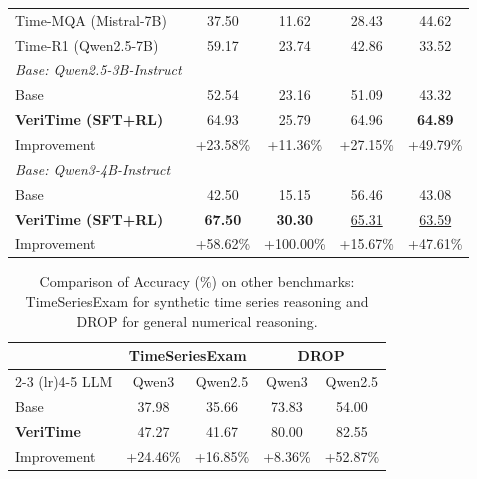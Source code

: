 \documentclass{article}
\theoremstyle{plain}
\theoremstyle{definition}
\theoremstyle{remark}
\begin{document}
\begin{table}[htbp]
\begin{tabular}{lcccc}
Time-MQA (Mistral-7B) & 37.50 & 11.62 & 28.43 & 44.62 \\
Time-R1 (Qwen2.5-7B) & 59.17 & 23.74 & 42.86 & 33.52 \\
\midrule
\textit{Base: Qwen2.5-3B-Instruct} \\
Base & 52.54 & 23.16 & 51.09 & 43.32 \\
\textbf{VeriTime (SFT+RL)} & 64.93 & 25.79 & 64.96 & \textbf{64.89} \\
\rowcolor{cyan!10} Improvement & +23.58\% & +11.36\% & +27.15\% & +49.79\% \\
\midrule
\textit{Base: Qwen3-4B-Instruct} \\
Base & 42.50 & 15.15 & 56.46 & 43.08 \\
\textbf{VeriTime (SFT+RL)} & \textbf{67.50} & \textbf{30.30} & \underline{65.31} & \underline{63.59} \\
\rowcolor{cyan!10} Improvement & +58.62\% & +100.00\% & +15.67\% & +47.61\% \\
\bottomrule
\end{tabular}
\vspace{-1.1em}
\end{table}

\begin{table}[htbp]
\vspace{-0.8em}
\footnotesize
\centering
\caption{Comparison of Accuracy (\%) on other benchmarks: TimeSeriesExam for synthetic time series reasoning and DROP for general numerical reasoning.}
\label{tab:tsexam_drop}
\setlength{\tabcolsep}{2.8pt}
\begin{tabular}{lcccc}
\toprule
& \multicolumn{2}{c}{\textbf{TimeSeriesExam}} & \multicolumn{2}{c}{\textbf{DROP}} \\
\cmidrule(lr){2-3} \cmidrule(lr){4-5}
LLM & Qwen3 & Qwen2.5 & Qwen3 & Qwen2.5 \\
\midrule
Base & 37.98 & 35.66 & 73.83 & 54.00 \\
\textbf{VeriTime} & 47.27 & 41.67 & 80.00 & 82.55 \\
\rowcolor{cyan!10}Improvement & +24.46\% & +16.85\% & +8.36\% & +52.87\% \\
\bottomrule
\end{tabular}
\vspace{-1.0em}
\end{table}
\end{document}
